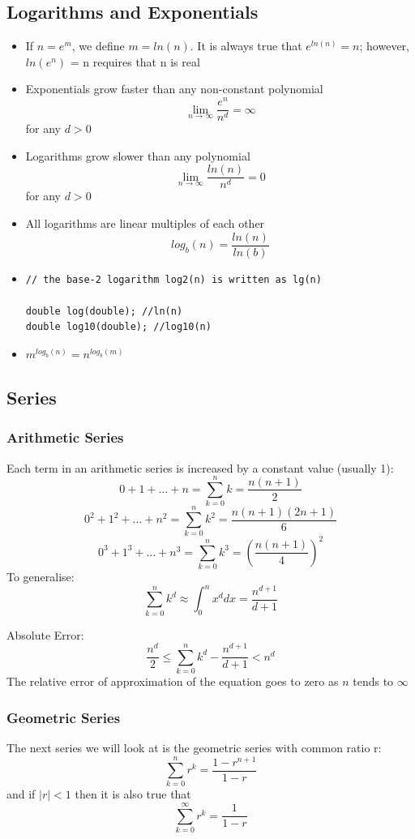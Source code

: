 \documentclass[11pt]{article}
\theoremstyle{definition}
\begin{document}
\newpage

\subsection{Logarithms and Exponentials}
\begin{itemize}[label={--}]
\item If  $n = e^m$, we define
$m = ln(n)$. It is always true that $e^{ln(n)} = n$; however, $ln(e^n)$ = n requires that n is real 
\item Exponentials grow faster than any non-constant polynomial
$$\mathop {\lim }\limits_{n \to \infty}\frac{e^n}{n^d} = \infty$$ for any $d > 0$
\item Logarithms grow slower than any polynomial
$$\mathop {\lim }\limits_{n \to \infty}\frac{ln(n)}{n^d} = 0$$ for any $d > 0$
\item All logarithms are linear multiples of each other
$$log_{b}(n) = \frac{ln(n)}{ln(b)}$$
\item \begin{lstlisting}
// the base-2 logarithm log2(n) is written as lg(n)

double log(double); //ln(n)
double log10(double); //log10(n)
\end{lstlisting}
\item $m^{log_{b}(n)} = n^{log_{b}(m)}$
\end{itemize}
\newpage
\subsection{Series}
\subsubsection{Arithmetic Series}
Each term in an arithmetic series is increased by a constant value (usually 1):
$$0 + 1 + \ldots + n = \sum_{k=0}^{n} k = \frac{n(n+1)}{2}$$
$$0^2 + 1^2 + \ldots + n^2 = \sum_{k=0}^{n} k^2 = \frac{n(n+1)(2n+1)}{6}$$
$$0^3 + 1^3 + \ldots + n^3 = \sum_{k=0}^{n} k^3 = (\frac{n(n+1)}{4})^2$$
To generalise: $$\sum_{k=0}^{n} k^d \approx \int_{0}^{n} x^d dx = \frac{n^{d+1}}{d+1}$$

Absolute Error:
$$
\frac{n^d}{2} \leq \sum_{k=0}^{n} k^d - \frac{n^{d+1}}{d+1} < n^d
$$
The relative error of approximation of the equation goes to zero as $n$ tends to $\infty$

\subsubsection{Geometric Series}
The next series we will look at is the geometric series with common ratio r:
$$\sum_{k=0}^{n} r^k = \frac{1-r^{n+1}}{1-r}$$
and if $|r| < 1$ then it is also true that
$$\sum_{k=0}^{\infty} r^k = \frac{1}{1-r}$$
\end{document}
